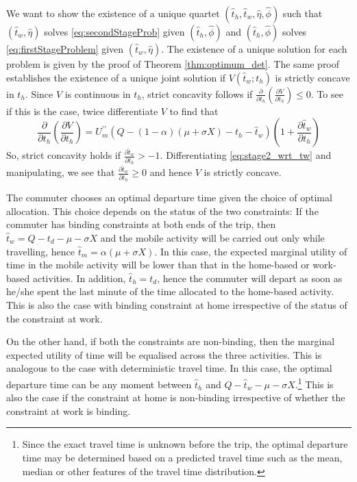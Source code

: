 \documentclass[12pt,a4paper,british]{article}
\makeatletter
\newenvironment{proof}[1][\proofname]{\par
    \normalfont\topsep6\p@\@plus6\p@\relax
    \trivlist
    \itemindent\parindent
    \item[\hskip\labelsep
          \scshape
      #1]\ignorespaces
  }{%
    \endtrivlist\@endpefalse
  }
\providecommand{\proofname}{Proof}
\makeatother
\begin{document}
\begin{proof}
We want to show the existence of a unique quartet $\left( \hat{t}_{h},\hat{t}_{w}, \hat{\eta},\hat{\phi}\right)$ such that $\left( \hat{t}_{w}, \hat{\eta}\right)$ solves \eqref{eq:secondStageProb} given $\left( \hat{t}_{h},\hat{\phi}\right)$ and $\left( \hat{t}_{h},\hat{\phi}\right)$ solves \eqref{eq:firstStageProblem} given $\left( \hat{t}_{w},\hat{\eta}\right)$. The existence of a unique solution for each problem is given by the proof of Theorem \ref{thm:optimum_det}. The same proof establishes the existence of a unique joint solution if $V\left(\hat{t}_{w};t_{h}\right)$ is strictly concave in $t_{h}$. Since $V$ is continuous in $t_{h}$, strict concavity follows if $\frac{\partial}{\partial t_{h}}\left(\frac{\partial V}{\partial t_{h}}\right) \leq 0$. To see if this is the case, twice differentiate $V$ to find that%
\begin{equation*}
\frac{\partial}{\partial t_{h}}\left(\frac{\partial V}{\partial t_{h}}\right) = U_{m}^{\prime\prime} \left(Q - \left(1 - \alpha\right) \left(\mu + \sigma X\right) - t_{h} - \hat{t}_{w} \right) \left( 1 + \frac{\partial\hat{t}_{w}}{\partial t_{h}}\right)
\end{equation*}
So, strict concavity holds if $\frac{\partial\hat{t}_{w}}{\partial t_{h}} > -1$. Differentiating \eqref{eq:stage2_wrt_tw} and manipulating, we see that  $\frac{\partial\hat{t}_{w}} {\partial t_{h}} \geq 0$ and hence $V$ is strictly concave.
\end{proof}


The commuter chooses an optimal departure time given the choice of optimal allocation. This choice depends on the status of the two constraints: If the commuter has binding constraints at both ends of the trip, then $\hat{t}_{w}=Q-t_{d}-\mu-\sigma X$ and the mobile activity will be carried out only while travelling, hence $\hat{t}_{m}=\alpha\left(\mu+\sigma X\right)$. In this case, the expected marginal utility of time in the mobile activity will be lower than that in the home-based or work-based activities. In addition, $\hat{t}_{h}=t_{d}$, hence the commuter will depart as soon as he/she spent the last minute of the time allocated to the home-based activity. This is also the case with binding constraint at home irrespective of the status of the constraint at work.

On the other hand, if both the constraints are non-binding, then the marginal expected utility of time will be equalised across the three activities. This is analogous to the case with deterministic travel time. In this case, the optimal departure time can be any moment between $\hat{t}_{h}$ and $Q-\hat{t}_{w}-\mu-\sigma X$.\footnote{Since the exact travel time is unknown before the trip, the optimal departure time may be determined based on a predicted travel time such as the mean, median or other features of the travel time distribution.} This is also the case if the constraint at home is non-binding irrespective of whether the constraint at work is binding. 
\end{document}
